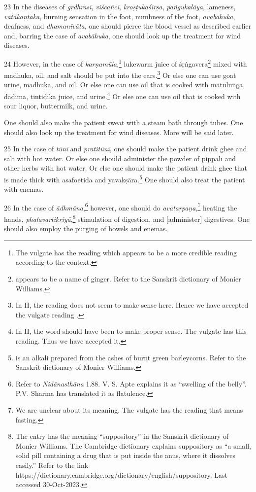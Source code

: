 \begin{translation}
    \item[23]
    In the diseases of \textit{gṛdhrasī}, \textit{viścañcī}, \textit{kroṣṭukaśīrṣa}, \textit{paṅgukalāya}, lameness, \textit{vātakaṇṭaka}, burning sensation in the foot, numbness of the foot, \textit{avabāhuka}, deafness, and \textit{dhamanīvāta}, one should pierce the blood vessel as described earlier and, barring the case of \textit{avabāhuka}, one should look up the treatment for wind diseases.

    \item[24]
    However, in the case of \textit{karṇamūla},\footnote{The vulgate has the reading  which appears to be a more credible reading according to the context.} lukewarm juice of \gls{śṛṅgavera}\footnote{ appears to be a name of ginger. Refer to the Sanskrit dictionary of Monier Williams.} mixed with \gls{madhuka}, oil, and salt should be put into the ears.\footnote{In H, the reading  does not seem to make sense here. Hence we have accepted the vulgate reading .} Or else one can use goat urine, \gls{madhuka}, and oil. Or else one can use oil that is cooked with \gls{mātuluṅga}, \gls{dāḍima}, \gls{tintiḍīka} juice, and urine.\footnote{In H, the word  should have been  to make proper sense. The vulgate has this reading. Thus we have accepted it.} Or else one can use oil that is cooked with sour liquor, buttermilk, and urine. 
    
    One should also make the patient sweat with a steam bath through tubes. One should also look up the treatment for wind diseases. More will be said later.

    \item[25]
    In the case of \textit{tūnī} and \textit{pratitūnī}, one should make the patient drink ghee and salt with hot water. Or else one should administer the powder of \gls{pippalī} and other herbs with hot water. Or else one should make the patient drink ghee that is made thick with asafoetida and \gls{yavakṣāra}.\footnote{ is an alkali prepared from the ashes of burnt green barleycorns. Refer to the Sanskrit dictionary of Monier Williams.} One should also treat the patient with enemas. 

    \item[26]
    In the case of \textit{ādhmāna},\footnote{Refer to \textit{Nidānasthāna} 1.88. V. S. Apte explains it as \enquote{swelling of the belly}. P.V. Sharma has translated it as flatulence.} however, one should do \textit{avatarpaṇa},\footnote{We are unclear about its meaning. The vulgate has the reading  that means fasting.} heating the hands, \textit{phalavartikriyā},\footnote{The entry  has the meaning \enquote{suppository} in the Sanskrit dictionary of Monier Williams. The Cambridge dictionary explains suppository as \enquote{a small, solid pill containing a drug that is put inside the anus, where it dissolves easily.} Refer to the link https://dictionary.cambridge.org/dictionary/english/suppository. Last accessed 30-Oct-2023.} stimulation of digestion, and [administer] digestives. One should also employ the purging of bowels and enemas. 


\end{translation}
